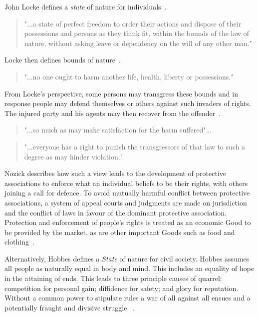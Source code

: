 \documentclass[11pt, oneside]{book}   	%
\begin{document}
John Locke defines a \emph{state} of nature for individuals~\cite{jl1}.

\begin{quote}
"...a state of perfect freedom to order their actions and dispose of their possessions and persons as they think fit, within the bounds of the law of nature, without asking leave or dependency on the will of any other man."
\end{quote}

Locke then defines bounds of nature~\cite{jl1}.

\begin{quote}
"...no one ought to harm another life, health, liberty or possessions."
\end{quote}

From Locke's perspective, some persons may transgress these bounds and in response people may defend themselves or others against such invaders of rights.
The injured party and his agents may then recover from the offender~\cite{jl1}.

\begin{quote}
"...so much as may make satisfaction for the harm suffered"...
\end{quote}
\begin{quote}
"...everyone has a right to punish the transgressors of that law to such a degree as may hinder violation."
\end{quote}

Nozick describes how such a view leads to the development of protective associations to enforce what an individual beliefs to be their rights, with others joining a call for defence.
To avoid mutually harmful conflict between protective associations, a system of appeal courts and judgments are made on jurisdiction and the conflict of laws in favour of the dominant protective association.
Protection and enforcement of people's rights is treated as an economic Good to be provided by the market, as are other important Goods such as food and clothing~\cite{rn1}.\

Alternatively, Hobbes defines a \emph{State} of nature for civil society.
Hobbes assumes all people as naturally equal in body and mind.
This includes an equality of hope in the attaining of ends.
This leads to three principle causes of quarrel: competition for personal gain; diffidence for safety; and glory for reputation. Without a common power to stipulate rules a war of all against all ensues and a potentially fraught and divisive struggle ~\cite{th1}.
\end{document}
